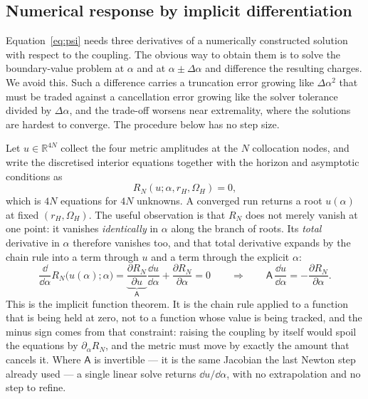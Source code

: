 \documentclass[11pt,a4paper]{article}
\begin{document}
\subsection{Numerical response by implicit differentiation}
\label{sec:response}

Equation~\eqref{eq:psi} needs three derivatives of a numerically constructed
solution with respect to the coupling. The obvious way to obtain them is to
solve the boundary-value problem at $\alpha$ and at $\alpha\pm\Delta\alpha$
and difference the resulting charges. We avoid this. Such a difference
carries a truncation error growing like $\Delta\alpha^2$ that must be traded
against a cancellation error growing like the solver tolerance divided by
$\Delta\alpha$, and the trade-off worsens near extremality, where the
solutions are hardest to converge. The procedure below has no step size.

Let $u\in\mathbb R^{4N}$ collect the four metric amplitudes at the $N$
collocation nodes, and write the discretised interior equations together with
the horizon and asymptotic conditions as
\begin{equation*}
 R_N(u;\alpha,r_H,\Omega_H)=0 ,
\end{equation*}
which is $4N$ equations for $4N$ unknowns. A converged run returns a root
$u(\alpha)$ at fixed $(r_H,\Omega_H)$. The useful observation is that $R_N$
does not merely vanish at one point: it vanishes \emph{identically} in
$\alpha$ along the branch of roots. Its \emph{total} derivative in $\alpha$
therefore vanishes too, and that total derivative expands by the chain rule
into a term through $u$ and a term through the explicit $\alpha$:
\begin{equation}
 \frac{\dd}{\dd\alpha}R_N\bigl(u(\alpha);\alpha\bigr)
 =\underbrace{\frac{\partial R_N}{\partial u}}_{\mathsf A}
  \frac{\dd u}{\dd\alpha}
 +\frac{\partial R_N}{\partial\alpha}=0
 \qquad\Longrightarrow\qquad
 \mathsf A\,\frac{\dd u}{\dd\alpha}=-\frac{\partial R_N}{\partial\alpha}.
 \label{eq:response}
\end{equation}
This is the implicit function theorem. It is the chain rule applied to a
function that is being held at zero, not to a function whose value is being
tracked, and the minus sign comes from that constraint: raising the coupling
by itself would spoil the equations by $\partial_\alpha R_N$, and the metric
must move by exactly the amount that cancels it. Where $\mathsf A$ is
invertible --- it is the same Jacobian the last Newton step already used ---
a single linear solve returns $\dd u/\dd\alpha$, with no extrapolation and no
step to refine.
\end{document}
